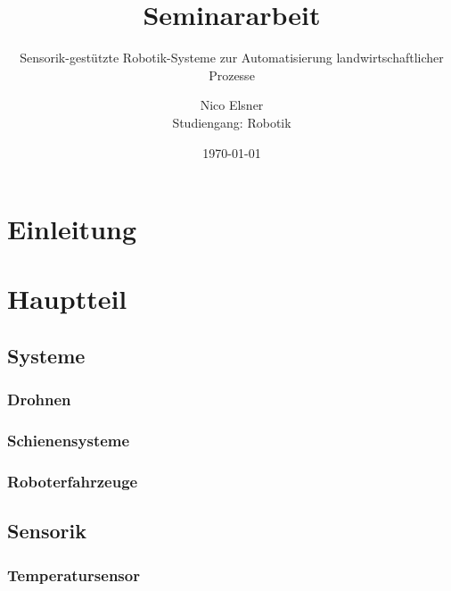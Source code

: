 \documentclass[a4paper,
			   11pt,
			   ngerman, 
			   headsepline]{scrreprt}
\begin{document}
	\pagestyle{scrheadings} 

	\title{Seminararbeit}
	\subtitle{Sensorik-gestützte Robotik-Systeme zur Automatisierung landwirtschaftlicher Prozesse}
	\author{Nico Elsner\\
	Studiengang: Robotik}
	\date{\today}
	\maketitle
	\tableofcontents
	\thispagestyle{empty}
	\newpage
	\setcounter{page}{1}
	\chapter{Einleitung}
	
	\chapter{Hauptteil}
	
	
	\section{Systeme}
		\subsection{Drohnen}
		
		\subsection{Schienensysteme}
		
		\subsection{Roboterfahrzeuge}
		

	\section{Sensorik}
	
		\subsection{Temperatursensor}
		
		\cite{oriolplanas2021}
\end{document}

